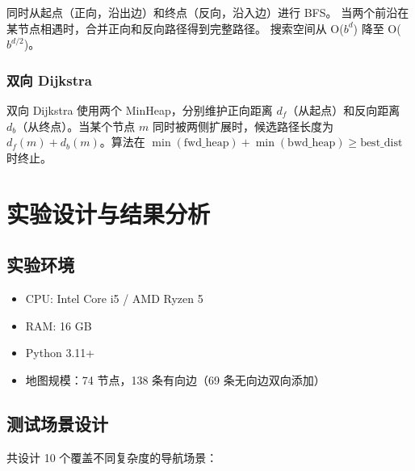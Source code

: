 \documentclass[11pt,a4paper]{ctexart}
\begin{document}
同时从起点（正向，沿出边）和终点（反向，沿入边）进行 BFS。
当两个前沿在某节点相遇时，合并正向和反向路径得到完整路径。
搜索空间从 O($b^d$) 降至 O($b^{d/2}$)。

\subsubsection{双向 Dijkstra}

双向 Dijkstra 使用两个 MinHeap，分别维护正向距离 $d_f$（从起点）和反向距离
$d_b$（从终点）。当某个节点 $m$ 同时被两侧扩展时，候选路径长度为
$d_f(m) + d_b(m)$。算法在 $\min(\text{fwd\_heap}) + \min(\text{bwd\_heap}) \geq
\text{best\_dist}$ 时终止。

\section{实验设计与结果分析}

\subsection{实验环境}

\begin{itemize}
    \item CPU: Intel Core i5 / AMD Ryzen 5
    \item RAM: 16 GB
    \item Python 3.11+
    \item 地图规模：74 节点，138 条有向边（69 条无向边双向添加）
\end{itemize}

\subsection{测试场景设计}

共设计 10 个覆盖不同复杂度的导航场景：
\end{document}
